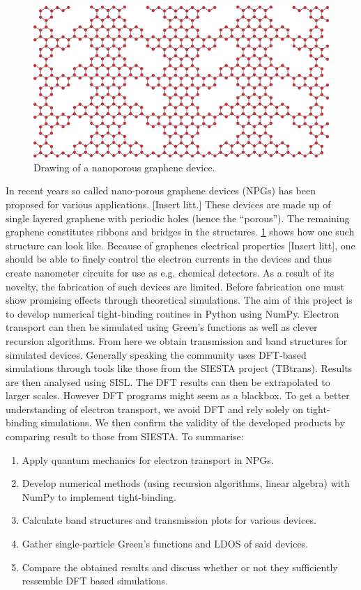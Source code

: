 \begin{figure}
	\vspace{-1em}
	\centering
	\includegraphics[width=.4\textwidth]{Figures/NPGintroGraphic.eps}
	\caption{Drawing of a nanoporous graphene device.}\label{introGraphic}
\end{figure}
In recent years so called nano-porous graphene devices (NPGs) has been proposed for various applications. [Insert litt.] These devices are made up of single layered graphene with periodic holes (hence the ``porous''). The remaining graphene constitutes ribbons and bridges in the structures. \cref{introGraphic} shows how one such structure can look like.
Because of graphenes electrical properties [Insert litt], one should be able to finely control the electron currents in the devices and thus create nanometer circuits for use as e.g. chemical detectors. As a result of its novelty, the fabrication of such devices are limited. Before fabrication one must show promising effects through theoretical simulations.\newline
The aim of this project is to develop numerical tight-binding routines in Python using NumPy. Electron transport can then be simulated using Green's functions as well as clever recursion algorithms. From here we obtain transmission and band structures for simulated devices.\newline
Generally speaking the community uses DFT-based simulations through tools like those from the SIESTA project (TBtrans). Results are then analysed using SISL\cite{zerothi_sisl}. The DFT results can then be extrapolated to larger scales\cite{calogero_electron_2019}. However DFT programs might seem as a blackbox. To get a better understanding of electron transport, we avoid DFT and rely solely on tight-binding simulations. We then confirm the validity of the developed products by comparing result to those from SIESTA.\newline
To summarise:
\begin{enumerate}
	\item Apply quantum mechanics for electron transport in NPGs.
	\item Develop numerical methods (using recursion algorithms, linear algebra) with NumPy to implement tight-binding.
	\item Calculate band structures and transmission plots for various devices.
	\item Gather single-particle Green’s functions and LDOS of said devices.
	\item Compare the obtained results and discuss whether or not they sufficiently ressemble DFT based simulations.
\end{enumerate}
